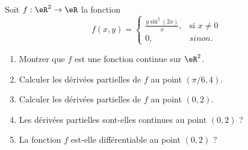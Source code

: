 \begin{exercice}\label{exocontrolecontinu0003}

Soit $f: \eR^2\to \eR $ la fonction
\begin{equation}
  f(x,y)=\left\{
  \begin{array}{ll}
    \frac{y\sin^2(2x)}{x}, & \textrm{si } x\neq 0\\
    0, & sinon. 
  \end{array}
  \right.
\end{equation}
  \begin{enumerate}
  \item Montrer que $f$ est une fonction continue sur $\eR^2$.
  \item Calculer les dérivées partielles de $f$ au point $(\pi/6, 4)$.
  \item Calculer les dérivées partielles de $f$ au point $(0,2)$.
  \item Les dérivées partielles sont-elles continues au point $(0,2)$ ?
  \item La fonction $f$ est-elle différentiable au point $(0,2)$ ? 
  \end{enumerate} 


\end{exercice}
